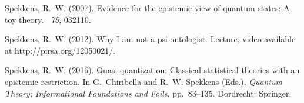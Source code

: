 \documentclass[12pt]{article}
\begin{document}
\begin{thebibliography}{50}
Spekkens, R.~W. (2007).
\newblock Evidence for the epistemic view of quantum states: A toy theory.
~{\em 75}, 032110.

Spekkens, R.~W. (2012).
\newblock Why {I} am not a psi-ontologist.
\newblock Lecture, video available at http://pirsa.org/12050021/.

Spekkens, R.~W. (2016).
\newblock Quasi-quantization: Classical statistical theories with an epistemic
  restriction.
\newblock In G.~Chiribella and R.~W. Spekkens (Eds.), {\em Quantum Theory:
  Informational Foundations and Foils}, pp.\  83--135. Dordrecht: Springer.

\end{thebibliography}
\end{document}
